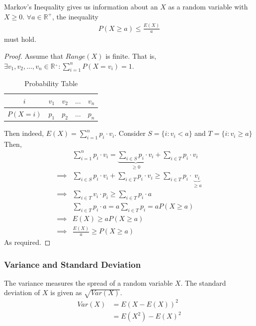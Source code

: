 \documentclass[a4paper]{article}
\theoremstyle{plain}
\newtheorem{thm}{Theorem}[section]
\theoremstyle{definition}
\newtheorem{defn}{Definition}[section]
\theoremstyle{remark}
\begin{document}
\begin{tcolorbox}[colback=black!3!white,colframe=black!60!white,title=\begin{thm}Markov's Inequality \label{Markov's Inequality}\end{thm}]
	Markov's Inequality gives us information about an $X$ as a random variable with $X \ge 0$. $\forall a \in \mathbb{R}^{+}$, the inequality
		\begin{align}
			P(X\ge a) \le \frac{E(X)}{a}
		\end{align}
	must hold. 
\begin{proof}
	Assume that $Range(X)$ is finite. That is, $\exists v_1,v_2,\ldots,v_n \in \mathbb{R}^{_+}: \sum_{i=1}^{n} P(X=v_i)=1$.
	\begin{table}[H]
		\centering
		\caption{Probability Table}
		\label{tab:probstable}
		\begin{tabular}{c|c|c|c|c}
			$i$ & $v_1$ & $v_2$ & $\ldots$ & $v_n $ \\
			\hline
			$P(X=i)$ & $p_1$ & $p_2$ & $\ldots$ & $p_n$
		\end{tabular}
	\end{table}
	Then indeed, $E(X) = \sum_{i=1}^{n} p_i \cdot v_i$. Consider $S = \{ i : v_i < a \} $ and $T = \{ i : v_i \ge  a \}$ Then,
	\begin{align*}
		&\sum_{i=1}^{n} p_i \cdot v_i = \underbrace{\sum_{i \in S} p_i \cdot v_i}_{\ge 0} + \sum_{i \in T}^{} p_i \cdot v_i \\
		\implies& \sum_{i \in S}^{} p_i \cdot v_i + \sum_{i \in T}^{} p_i \cdot v_i \ge  \sum_{i \in T}^{} p_i \cdot \underbrace{v_i} _{\ge a} \\
		\implies& \sum_{i \in T}^{} v_i \cdot p_i \ge \sum_{i \in T}^{} p_i \cdot a \\
			&\sum_{i \in T}^{} p_i \cdot a = a \sum_{i \in T}^{} p_i = aP(X\ge a) \\
		\implies & E(X) \ge a P(X\ge a) \\
		\implies & \frac{E(X)}{a} \ge  P(X\ge a)
	\end{align*}
As required.
\end{proof}
\end{tcolorbox}
\subsubsection{Variance and Standard Deviation}

\begin{tcolorbox}[colback=black!3!white,colframe=black!60!white,title=\begin{defn}Variance\label{Variance}\end{defn}]
The variance measures the spread of a random variable $X$. The standard deviation of $X$ is given as $\sqrt{Var(X)} $.
\begin{align}
	Var(X) &= E(X-E(X))^2 \\
	       &= E(X^2) - E(X)^2
\end{align}
\end{tcolorbox}
\end{document}
